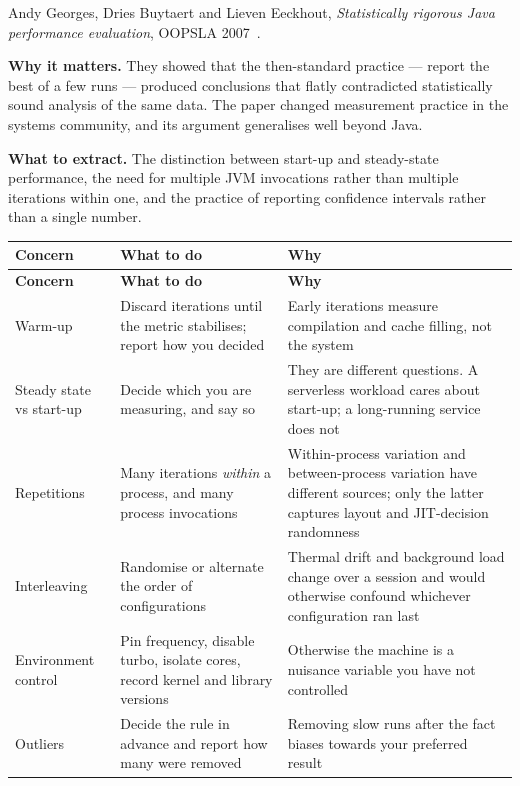 \begin{paperbox}
Andy Georges, Dries Buytaert and Lieven Eeckhout, \emph{Statistically rigorous
Java performance evaluation}, OOPSLA 2007~\cite{georges2007statistically}.

\medskip
\textbf{Why it matters.} They showed that the then-standard practice --- report
the best of a few runs --- produced conclusions that flatly contradicted
statistically sound analysis of the same data. The paper changed measurement
practice in the systems community, and its argument generalises well beyond
Java.

\medskip
\textbf{What to extract.} The distinction between start-up and steady-state
performance, the need for multiple JVM invocations rather than multiple
iterations within one, and the practice of reporting confidence intervals
rather than a single number.
\end{paperbox}

\begin{center}
\small
\begin{longtable}{@{}L{3.0cm}L{5.2cm}L{6.0cm}@{}}
\toprule
\textbf{Concern} & \textbf{What to do} & \textbf{Why} \\
\midrule
\endfirsthead
\toprule
\textbf{Concern} & \textbf{What to do} & \textbf{Why} \\
\midrule
\endhead
\bottomrule
\endfoot
Warm-up
  & Discard iterations until the metric stabilises; report how you decided
  & Early iterations measure compilation and cache filling, not the system \\
Steady state vs start-up
  & Decide which you are measuring, and say so
  & They are different questions. A serverless workload cares about start-up;
    a long-running service does not \\
Repetitions
  & Many iterations \emph{within} a process, and many process invocations
  & Within-process variation and between-process variation have different
    sources; only the latter captures layout and JIT-decision randomness \\
Interleaving
  & Randomise or alternate the order of configurations
  & Thermal drift and background load change over a session and would otherwise
    confound whichever configuration ran last \\
Environment control
  & Pin frequency, disable turbo, isolate cores, record kernel and library
    versions
  & Otherwise the machine is a nuisance variable you have not controlled \\
Outliers
  & Decide the rule in advance and report how many were removed
  & Removing slow runs after the fact biases towards your preferred result \\
\end{longtable}
\end{center}

